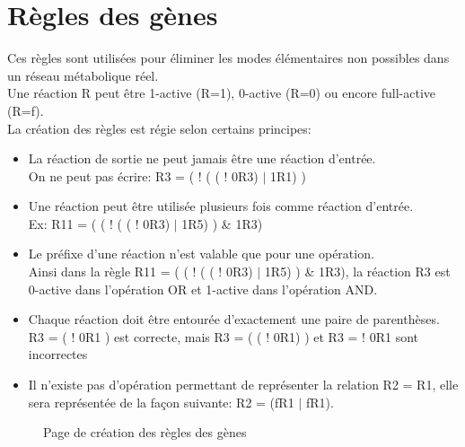 \section{Règles des gènes}

Ces règles sont utilisées pour éliminer les modes élémentaires non possibles dans un réseau métabolique réel.\\

Une réaction R peut \^etre 1-active (R=1), 0-active (R=0) ou encore full-active (R=f).\\
La création des règles est régie selon certains principes:
\begin{itemize}
\item La réaction de sortie ne peut jamais être une réaction d'entrée. \\On ne peut pas écrire: R3 = ( ! ( ( ! 0R3) $|$  1R1) )
\item Une réaction peut être utilisée plusieurs fois comme réaction d'entrée. \\Ex: R11 = ( ( ! ( ( ! 0R3) $|$ 1R5) ) \& 1R3)
\item Le préfixe d'une réaction n'est valable que pour une opération.\\ Ainsi dans la règle R11 = ( ( ! ( ( ! 0R3) $|$ 1R5) ) \& 1R3), la réaction R3 est 0-active dans l'opération OR et 1-active dans l'opération AND.
\item Chaque réaction doit être entourée d'exactement une paire de parenthèses. \\R3 = ( ! 0R1 ) est correcte, mais R3 = ( ( ! 0R1) ) et R3 = ! 0R1 sont incorrectes
\item Il n'existe pas d'opération permettant de représenter la relation R2 = R1, elle sera représentée de la façon suivante: R2 = (fR1 $|$ fR1).\\
\end{itemize}

\begin{figure}[!ht]
	\begin{center}
		\caption{Page de création des règles des gènes}
  		\label{generules}
  	\end{center}	
\end{figure}

